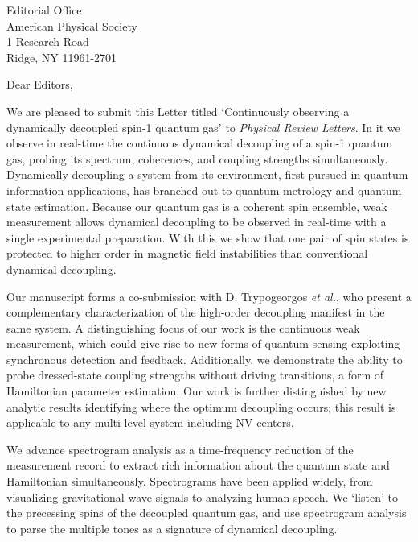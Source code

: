 \documentclass[10pt,letterpaper]{letter} %
\begin{document}
\begin{letter}{
    Editorial Office\\
    American Physical Society\\
    1 Research Road \\
    Ridge, NY 11961-2701\\
}

\opening{Dear Editors,}

We are pleased to submit this Letter titled `Continuously observing a dynamically decoupled spin-1 quantum gas' to \textit{Physical Review Letters}.
In it we observe in real-time the continuous dynamical decoupling of a spin-1 quantum gas, probing its spectrum, coherences, and coupling strengths simultaneously.
Dynamically decoupling a system from its environment, first pursued in quantum information applications, has branched out to quantum metrology and quantum state estimation.
Because our quantum gas is a coherent spin ensemble, weak measurement allows dynamical decoupling to be observed in real-time with a single experimental preparation.
With this we show that one pair of spin states is protected to higher order in magnetic field instabilities than conventional dynamical decoupling.  

Our manuscript forms a co-submission with D. Trypogeorgos \textit{et al.}, who present a complementary characterization of the high-order decoupling manifest in the same system.
A distinguishing focus of our work is the continuous weak measurement, which could give rise to new forms of quantum sensing exploiting synchronous detection and feedback.
Additionally, we demonstrate the ability to probe dressed-state coupling strengths without driving transitions, a form of Hamiltonian parameter estimation.
Our work is further distinguished by new analytic results identifying where the optimum decoupling occurs; this result is applicable to any multi-level system including NV centers.

We advance spectrogram analysis as a time-frequency reduction of the measurement record to extract rich information about the quantum state and Hamiltonian simultaneously.
Spectrograms have been applied widely, from visualizing gravitational wave signals to analyzing human speech.
We `listen' to the precessing spins of the decoupled quantum gas, and use spectrogram analysis to parse the multiple tones as a signature of dynamical decoupling.


\end{letter}
\end{document}
